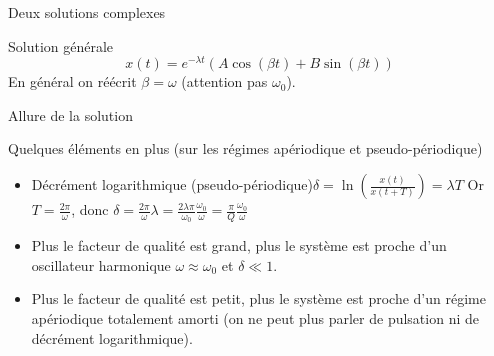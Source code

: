 \documentclass{beamer}
\begin{document}
    \begin{frame}{Deux solutions complexes}
        \begin{block}{Solution générale}
            \begin{equation}
                x(t) = e^{-\lambda t} \left(A \cos(\beta t) + B \sin(\beta t)\right)
            \end{equation}
            En général on réécrit $\beta = \omega$ (attention pas $\omega_0$).
        \end{block}
        \begin{block}{Allure de la solution}
        \end{block}
    \end{frame}
       \begin{frame}{Quelques éléments en plus (sur les régimes apériodique et pseudo-périodique)}
        \begin{itemize}
            \item Décrément logarithmique (pseudo-périodique)$\delta = \ln \left(\frac{x(t)}{x(t+T)}\right) = \lambda T$
            Or $T=\frac{2\pi}{\omega}$, donc $\delta = \frac{2\pi}{\omega} \lambda = \frac{2\lambda\pi}{\omega_0} \frac{\omega_0}{\omega} = \frac{\pi}{Q}\frac{\omega_0}{\omega}$
            \item Plus le facteur de qualité est grand, plus le système est proche d'un oscillateur harmonique $\omega\approx \omega_0$ et $\delta\ll 1$.
            \item Plus le facteur de qualité est petit, plus le système est proche d'un régime apériodique totalement amorti (on ne peut plus parler de pulsation ni de décrément logarithmique).
        \end{itemize}
    \end{frame}
\end{document}
